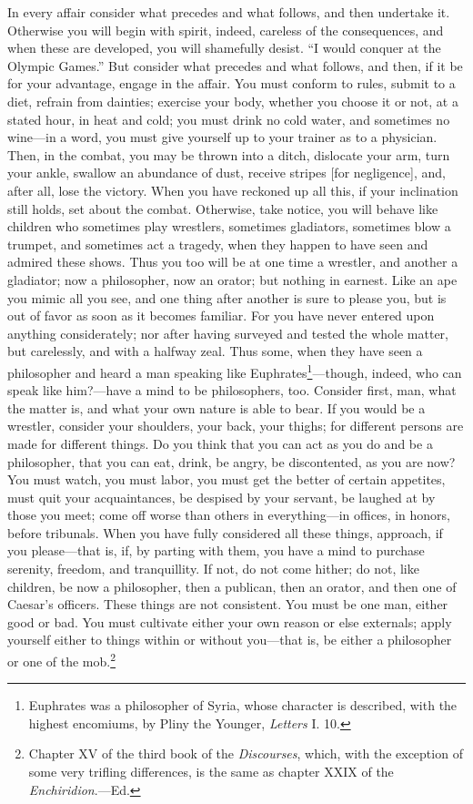 In every affair consider what precedes and what follows, and then undertake it.
Otherwise you will begin with spirit, indeed, careless of the consequences, and
when these are developed, you will  shamefully desist. ``I would conquer at the
Olympic Games.'' But  consider what precedes and what follows,  and then, if it
be for your advantage, engage in the  affair. You must conform to rules, submit
to a diet, refrain from dainties; exercise  your body, whether you choose it or
not, at  a stated hour,  in heat and  cold; you must  drink no cold  water, and
sometimes no wine---in a word, you must  give yourself up to your trainer as to
a physician.  Then, in the  combat, you may be  thrown into a  ditch, dislocate
your arm, turn  your ankle, swallow an abundance of  dust, receive stripes [for
negligence], and,  after all, lose the  victory. When you have  reckoned up all
this, if  your inclination still holds,  set about the combat.  Otherwise, take
notice, you will  behave like children who sometimes  play wrestlers, sometimes
gladiators, sometimes  blow a trumpet, and  sometimes act a tragedy,  when they
happen to have seen and admired these shows. Thus you too will be at one time a
wrestler,  and another  a  gladiator; now  a philosopher,  now  an orator;  but
nothing in  earnest. Like an  ape you  mimic all you  see, and one  thing after
another is  sure to  please you,  but is  out of  favor as  soon as  it becomes
familiar. For  you have  never entered upon  anything considerately;  nor after
having surveyed and tested the whole matter, but carelessly, and with a halfway
zeal. Thus  some, when they  have seen a philosopher  and heard a  man speaking
like Euphrates\footnote{Euphrates  was a philosopher of  Syria, whose character
is described, with the highest  encomiums, by Pliny the Younger, \emph{Letters}
I.  10.}---though,  indeed,  who  can  speak like  him?---have  a  mind  to  be
philosophers, too. Consider  first, man, what the matter is,  and what your own
nature is able  to bear. If you  would be a wrestler,  consider your shoulders,
your back, your thighs; for different persons are made for different things. Do
you think that  you can act as you  do and be a philosopher, that  you can eat,
drink,  be  angry,  be discontented,  as  you  are  now?  You must  watch,  you
must  labor, you  must get  the  better of  certain appetites,  must quit  your
acquaintances, be  despised by your servant,  be laughed at by  those you meet;
come  off worse  than  others  in everything---in  offices,  in honors,  before
tribunals. When  you have fully considered  all these things, approach,  if you
please---that  is, if,  by  parting with  them,  you have  a  mind to  purchase
serenity, freedom, and  tranquillity. If not, do not come  hither; do not, like
children, be now a  philosopher, then a publican, then an  orator, and then one
of Caesar's  officers. These things  are not consistent.  You must be  one man,
either  good  or  bad. You  must  cultivate  either  your  own reason  or  else
externals; apply yourself either to things  within or without you---that is, be
either a philosopher  or one of the mob.\footnote{Chapter XV  of the third book
of  the \emph{Discourses},  which, with  the  exception of  some very  trifling
differences, is the same as chapter XXIX of the \emph{Enchiridion}.---Ed.}

